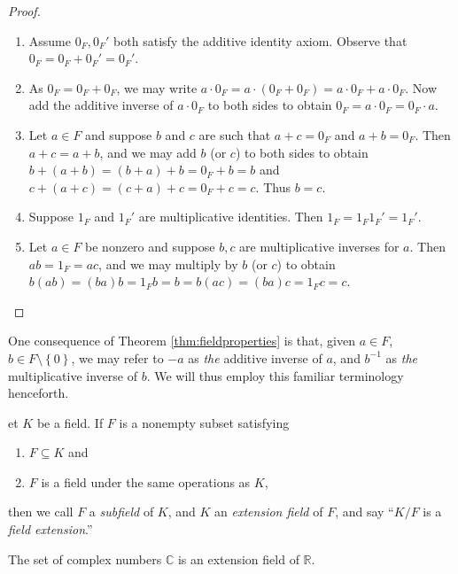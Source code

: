 \documentclass[english,course]{lecture}
\theoremstyle{plain}
\newenvironment{definition}[1]
  {\renewcommand\theinnerdefinition{#1}\innerdefinition}
  {\endinnerdefinition}
\def\set#1{\left\{ {#1} \right\}}
\def\C{{\mathbb C}}
\def\R{{\mathbb R}}
\def\presnotes{}
\begin{document}
\begin{proof}
\
	\begin{enumerate}
		\item Assume $0_F, 0_F'$ both satisfy the additive identity axiom. Observe that $0_F = 0_F + 0_F' = 0_F'$.
		\item As $0_F = 0_F + 0_F$, we may write $a\cdot 0_F = a\cdot (0_F + 0_F) = a\cdot  0_F + a \cdot 0_F$. Now add the additive inverse of $a\cdot 0_F$ to both sides to obtain $0_F = a \cdot 0_F = 0_F\cdot  a$.
		\item Let $a\in F$ and suppose $b$ and $c$ are such that $a+c = 0_F$ and $a+b = 0_F$. Then $a+c = a+b$, and we may add $b$ (or $c$) to both sides to obtain $b+(a+b) = (b+a)+b = 0_F + b = b$ and $c+(a+c) = (c+a)+c = 0_F + c = c$. Thus $b=c$.
		\item Suppose $1_F$ and $1_F'$ are multiplicative identities. Then $1_F = 1_F 1_F' = 1_F'$.
		\item Let $a\in F$ be nonzero and suppose $b,c$ are multiplicative inverses for $a$. Then $ab = 1_F = ac$, and we may multiply by $b$ (or $c$) to obtain $b(ab) = (ba)b = 1_F b = b = b(ac) = (ba)c = 1_F c = c$.
	\end{enumerate}
\end{proof}

\presnotes


One consequence of Theorem \ref{thm:fieldproperties} is that, given $a\in F$, $b\in F\setminus \set{0}$, we may refer to $-a$ as \emph{the} additive inverse of $a$, and $b^{-1}$ as \emph{the} multiplicative inverse of $b$.
We will thus employ this familiar terminology henceforth.


\begin{definition}
	Let $K$ be a field. If $F$ is a nonempty subset satisfying 
    \begin{enumerate}
    	\item $F\subseteq K$ and
        \item $F$ is a field under the same operations as $K$,
    \end{enumerate} 
      then we call $F$ a \emph{subfield} of $K$, and $K$ an \emph{extension field} of $F$, and say ``$K/F$ is a \emph{field extension}.''
\end{definition}

\begin{exer}
	The set of complex numbers $\C$ is an extension field of $\R$.
\end{exer}

\presnotes
\end{document}
